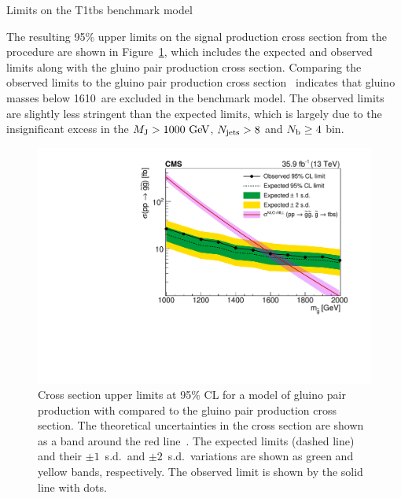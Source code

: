 \begin{section}{Limits on the T1tbs benchmark model}

The resulting 95\% upper limits on the signal production cross section from the \CLs procedure are shown in Figure~\ref{fig:limits}, which includes the expected and observed limits along with the gluino pair production cross section.
Comparing the observed limits to the gluino pair production cross section~\cite{XSecgluinogluino} indicates that gluino masses below 1610~\GeV are excluded in the benchmark \smsDecay model.
The observed limits are slightly less stringent than the expected limits, which is largely due to the insignificant excess in the $M_{\mathrm{J}} > 1000~\mathrm{Ge\kern -0.1em V}$, $N_{\mathrm{jets}} > 8$ and $N_{\mathrm{b}} \geq 4$ bin.

\begin{figure}[tbp!]
\centering
\includegraphics[angle=0,width=0.80\columnwidth]{fig/limits.pdf}
\caption{Cross section upper limits at 95\% CL for a model of gluino pair production with \smsDecay compared to the gluino pair production cross section.
The theoretical uncertainties in the cross section are shown as a band around the
red line~\cite{XSecgluinogluino}.
The expected limits (dashed line) and their $\pm1$~s.d.\ and $\pm2$~s.d.\ variations are shown as green and yellow bands, respectively.
The observed limit is shown by the solid line with dots.}
\label{fig:limits}
\end{figure}

\end{section}
